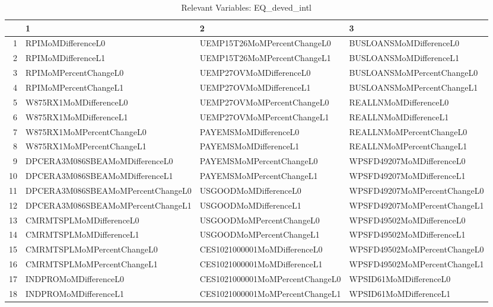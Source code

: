 \begin{longtable}{rlll}
\caption{Relevant Variables: EQ_deved_intl} \\ 
  \hline
 & 1 & 2 & 3 \\ 
  \hline
1 & RPIMoMDifferenceL0 & UEMP15T26MoMPercentChangeL0 & BUSLOANSMoMDifferenceL0 \\ 
  2 & RPIMoMDifferenceL1 & UEMP15T26MoMPercentChangeL1 & BUSLOANSMoMDifferenceL1 \\ 
  3 & RPIMoMPercentChangeL0 & UEMP27OVMoMDifferenceL0 & BUSLOANSMoMPercentChangeL0 \\ 
  4 & RPIMoMPercentChangeL1 & UEMP27OVMoMDifferenceL1 & BUSLOANSMoMPercentChangeL1 \\ 
  5 & W875RX1MoMDifferenceL0 & UEMP27OVMoMPercentChangeL0 & REALLNMoMDifferenceL0 \\ 
  6 & W875RX1MoMDifferenceL1 & UEMP27OVMoMPercentChangeL1 & REALLNMoMDifferenceL1 \\ 
  7 & W875RX1MoMPercentChangeL0 & PAYEMSMoMDifferenceL0 & REALLNMoMPercentChangeL0 \\ 
  8 & W875RX1MoMPercentChangeL1 & PAYEMSMoMDifferenceL1 & REALLNMoMPercentChangeL1 \\ 
  9 & DPCERA3M086SBEAMoMDifferenceL0 & PAYEMSMoMPercentChangeL0 & WPSFD49207MoMDifferenceL0 \\ 
  10 & DPCERA3M086SBEAMoMDifferenceL1 & PAYEMSMoMPercentChangeL1 & WPSFD49207MoMDifferenceL1 \\ 
  11 & DPCERA3M086SBEAMoMPercentChangeL0 & USGOODMoMDifferenceL0 & WPSFD49207MoMPercentChangeL0 \\ 
  12 & DPCERA3M086SBEAMoMPercentChangeL1 & USGOODMoMDifferenceL1 & WPSFD49207MoMPercentChangeL1 \\ 
  13 & CMRMTSPLMoMDifferenceL0 & USGOODMoMPercentChangeL0 & WPSFD49502MoMDifferenceL0 \\ 
  14 & CMRMTSPLMoMDifferenceL1 & USGOODMoMPercentChangeL1 & WPSFD49502MoMDifferenceL1 \\ 
  15 & CMRMTSPLMoMPercentChangeL0 & CES1021000001MoMDifferenceL0 & WPSFD49502MoMPercentChangeL0 \\ 
  16 & CMRMTSPLMoMPercentChangeL1 & CES1021000001MoMDifferenceL1 & WPSFD49502MoMPercentChangeL1 \\ 
  17 & INDPROMoMDifferenceL0 & CES1021000001MoMPercentChangeL0 & WPSID61MoMDifferenceL0 \\ 
  18 & INDPROMoMDifferenceL1 & CES1021000001MoMPercentChangeL1 & WPSID61MoMDifferenceL1 \\ 

\end{longtable}
